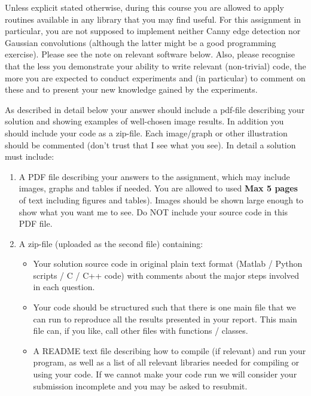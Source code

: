 \documentclass[a4paper,12pts]{article}
\begin{document}
Unless explicit stated otherwise, during this course you are allowed
to apply routines available in any library that you may find useful.
For this assignment in particular, you are not supposed to implement
neither Canny edge detection nor Gaussian convolutions (although the
latter might be a good programming exercise). Please see the note on
relevant software below. Also, please recognise that the less you
demonstrate your ability to write relevant (non-trivial) code, the
more you are expected to conduct experiments and (in particular) to
comment on these and to present your new knowledge gained by the
experiments. 
\medskip

As described in detail below your answer should include a pdf-file
describing your solution and showing examples of well-chosen image
results. In addition you should include your code as a zip-file.  Each
image/graph or other illustration should be commented (don't trust
that I see what you see).  In detail a  solution must include:

\begin{enumerate}
\item  A PDF file describing your answers to the assignment,
  which may include images, graphs and tables if needed. You are
  allowed to used {\bf Max 5 pages} of text including figures and
  tables).  Images should be shown large enough to show what you want
  me to see. Do NOT include your source code  in this PDF file. 

\item A  zip-file (uploaded as the second file) containing: 
\begin{itemize}
\item Your solution source code in original plain text format (Matlab 
  / Python scripts / C / C++ code) with comments about the major steps
  involved in each question.  
\item Your code should be structured such that there is one main file
  that we can run to reproduce all the results presented in your
  report. This main file can, if you like, call other files with
  functions / classes.
\item A README text file describing how
  to compile (if relevant) and run your program, as well as a list of
  all relevant libraries needed for compiling or using your code. If
  we cannot make your code run we will consider your submission
  incomplete and you may be asked to resubmit.
\end{itemize}
\end{enumerate}
\end{document}
